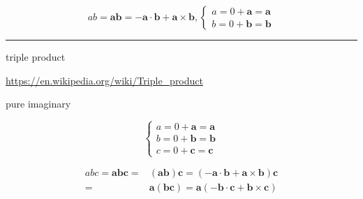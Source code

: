 \documentclass[
]{book}
\theoremstyle{definition}
\theoremstyle{definition}
\theoremstyle{definition}
\theoremstyle{definition}
\theoremstyle{remark}
\begin{document}
\[
ab=\boldsymbol{a}\boldsymbol{b}=-\boldsymbol{a}\cdot\boldsymbol{b}+\boldsymbol{a}\times\boldsymbol{b},\begin{cases}
a=0+\boldsymbol{a}=\boldsymbol{a}\\
b=0+\boldsymbol{b}=\boldsymbol{b}
\end{cases}
\]

\begin{center}\rule{0.5\linewidth}{0.5pt}\end{center}

triple product

\url{https://en.wikipedia.org/wiki/Triple_product}

pure imaginary

\[
\begin{cases}
a=0+\boldsymbol{a}=\boldsymbol{a}\\
b=0+\boldsymbol{b}=\boldsymbol{b}\\
c=0+\boldsymbol{c}=\boldsymbol{c}
\end{cases}
\]

\[
\begin{aligned}
abc=\boldsymbol{a}\boldsymbol{b}\boldsymbol{c}= & \left(\boldsymbol{a}\boldsymbol{b}\right)\boldsymbol{c}=\left(-\boldsymbol{a}\cdot\boldsymbol{b}+\boldsymbol{a}\times\boldsymbol{b}\right)\boldsymbol{c}\\
= & \boldsymbol{a}\left(\boldsymbol{b}\boldsymbol{c}\right)=\boldsymbol{a}\left(-\boldsymbol{b}\cdot\boldsymbol{c}+\boldsymbol{b}\times\boldsymbol{c}\right)
\end{aligned}
\]
\end{document}
